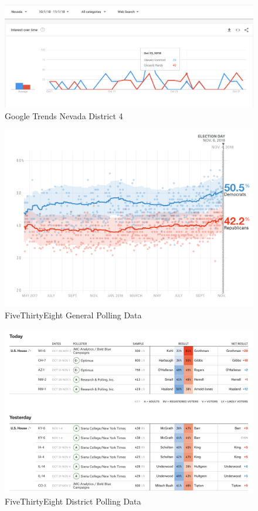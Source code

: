 \documentclass[12pt, letterpaper]{article}
\begin{document}
 \begin{figure}[tbh]
  \centering
  \includegraphics[scale=0.4]{google_trends_ex}
  \caption{Google Trends Nevada District 4}
  \label{fig:trends}
\end{figure}

 \begin{figure}[tbh]
  \centering
  \includegraphics[scale=0.45]{general_polling}
  \caption{FiveThirtyEight General Polling Data}
  \label{fig:genpolls}
\end{figure}

 \begin{figure}[tbh]
  \centering
  \includegraphics[scale=0.4]{district_polls}
  \caption{FiveThirtyEight District Polling Data}
  \label{fig:distpolls}
\end{figure}
\end{document}
